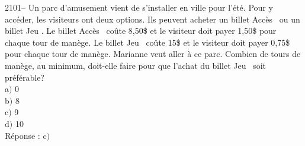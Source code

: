 \documentclass[letterpaper, 12pt]{article}
\begin{document}
2101-- Un parc d'amusement vient de s'installer en ville pour l'\'et\'e. Pour y acc\'eder, les visiteurs ont deux options. Ils peuvent acheter un billet \og Acc\`es \fg\, ou un billet \og Jeu \fg. Le billet \og Acc\`es \fg\, co\^ute 8,50\$ et le visiteur doit payer 1,50\$ pour chaque tour de man\`ege. Le billet \og Jeu \fg\, co\^ute 15\$ et le visiteur doit payer 0,75\$ pour chaque tour de man\`ege. Marianne veut aller \`a ce parc. Combien de tours de man\`ege, au minimum, doit-elle faire pour que l'achat du billet \og Jeu \fg\, soit pr\'ef\'erable?\\

a$)$ 0\\
b$)$ 8\\
c$)$ 9\\
d$)$ 10\\

R\'eponse : c$)$\\
\end{document}
